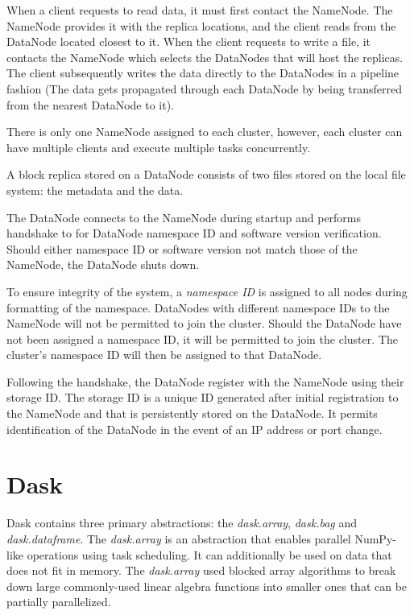\documentclass{report}
\begin{document}
        When a client requests to read data, it must first contact the NameNode.
        The NameNode provides it with the replica locations, and the client
        reads from the DataNode located closest to it. When the client requests
        to write a file, it contacts the NameNode which selects the DataNodes
        that will host the replicas. The client subsequently writes the data
        directly to the DataNodes in a pipeline fashion (The data gets
        propagated through each DataNode by being transferred from the nearest
        DataNode to it).

        There is only one NameNode assigned to each cluster, however, each
        cluster can have multiple clients and execute multiple tasks
        concurrently.


        A block replica stored on a DataNode consists of two files stored on the
        local file system: the metadata and the data. 

        The DataNode connects to the NameNode during startup and performs
        handshake to for DataNode namespace ID and software version
        verification. Should either namespace ID or software version not match
        those of the NameNode, the DataNode shuts down.

        To ensure integrity of the system, a \textit{namespace ID} is assigned
        to all nodes during formatting of the namespace.  DataNodes with
        different namespace IDs to the NameNode will not be permitted to join
        the cluster. Should the DataNode have not been assigned a namespace ID,
        it will be permitted to join the cluster. The cluster's namespace ID
        will then be assigned to that DataNode.


        Following the handshake, the DataNode register with the NameNode using
        their storage ID. The storage ID is a unique ID generated after initial
        registration to the NameNode and that is persistently stored on the
        DataNode. It permits identification of the DataNode in the event of an
        IP address or port change. 
        
        \section{Dask}
        Dask contains three primary abstractions: the \textit{dask.array}, 
        \textit{dask.bag} and \textit{dask.dataframe}. The \textit{dask.array} 
        is an abstraction that enables parallel NumPy-like operations using task
        scheduling. It can additionally be used on data that does not fit in 
        memory. The \textit{dask.array} used blocked array algorithms to break 
        down large commonly-used linear algebra functions into smaller ones that
        can be partially parallelized.
\end{document}
